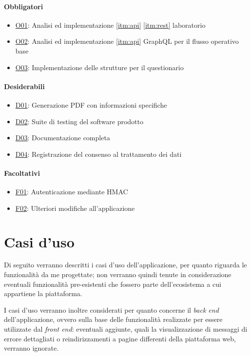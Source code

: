 \paragraph{Obbligatori}
\begin{itemize}
    \item \underline{O01}: Analisi ed implementazione \ref{itm:api} \ref{itm:rest} laboratorio
    \item \underline{O02}: Analisi ed implementazione \ref{itm:api} GraphQL per il flusso operativo base
    \item \underline{O03}: Implementazione delle strutture per il questionario
\end{itemize}
\vspace{-15pt}
\paragraph{Desiderabili}
\begin{itemize}
    \item \underline{D01}: Generazione PDF con informazioni specifiche
    \item \underline{D02}: Suite di testing del software prodotto
    \item \underline{D03}: Documentazione completa
    \item \underline{D04}: Registrazione del consenso al trattamento dei dati
\end{itemize}
\vspace{-15pt}
\paragraph{Facoltativi}
\begin{itemize}
    \item \underline{F01}: Autenticazione mediante HMAC
    \item \underline{F02}: Ulteriori modifiche all’applicazione
\end{itemize}
\section{Casi d'uso}
\label{sec:usecase}
Di seguito verranno descritti i casi d'uso dell'applicazione, per quanto riguarda le funzionalità da me progettate; non verranno quindi tenute in considerazione eventuali funzionalità pre-esistenti che fossero parte dell'ecosistema a cui appartiene la piattaforma.

I casi d'uso verranno inoltre considerati per quanto concerne il \textit{back end} dell'applicazione, ovvero sulla base delle funzionalità realizzate per essere utilizzate dal \textit{front end}: eventuali aggiunte, quali la visualizzazione di messaggi di errore dettagliati o reindirizzamenti a pagine differenti della piattaforma web, verranno ignorate.

